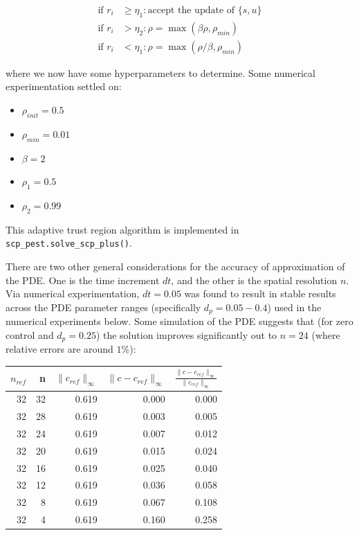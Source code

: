 \documentclass[11pt]{article}
\begin{document}
\begin{align}
\text{if } r_i &\geq \eta_1 : \text{accept the update of } \{s,u\} \nonumber \\
\text{if } r_i &> \eta_2 : \rho = \max\left(\beta \rho, \rho_{min}\right) \nonumber \\
\text{if } r_i &< \eta_1 : \rho = \max\left(\rho / \beta, \rho_{min}\right) \nonumber
\end{align}

where we now have some hyperparameters to determine. Some numerical experimentation settled on:

\begin{itemize}
\setlength\itemsep{-1pt}
\item $\rho_{init} = 0.5$
\item $\rho_{min} = 0.01$
\item $\beta = 2$
\item $\rho_1 = 0.5$
\item $\rho_2 = 0.99$
\end{itemize}

This adaptive trust region algorithm is implemented in \texttt{scp\_pest.solve\_scp\_plus()}.

There are two other general considerations for the accuracy of approximation of the PDE. One is the time increment $dt$, and the other is the spatial resolution $n$. Via numerical experimentation, $dt = 0.05$ was found to result in stable results across the PDE parameter ranges (specifically $d_p = 0.05 - 0.4$) used in the numerical experiments below. Some simulation of the PDE suggests that (for zero control and $d_p = 0.25$) the solution improves significantly out to $n = 24$ (where relative errors are around $1\%$):

\begin{center}
\begin{tabular}{rrrrr}
\toprule
$n_{ref}$ & n & $\| c_{ref} \|_{\infty}$ & $\| c-c_{ref} \|_{\infty}$ & $\frac{\| c-c_{ref} \|_{\infty}}{\| c_{ref} \|_{\infty}}$ \\
\midrule
32 & 32 & 0.619 & 0.000 & 0.000 \\
32 & 28 & 0.619 & 0.003 & 0.005 \\
32 & 24 & 0.619 & 0.007 & 0.012 \\
32 & 20 & 0.619 & 0.015 & 0.024 \\
32 & 16 & 0.619 & 0.025 & 0.040 \\
32 & 12 & 0.619 & 0.036 & 0.058 \\
32 & 8 & 0.619 & 0.067 & 0.108 \\
32 & 4 & 0.619 & 0.160 & 0.258 \\
\bottomrule
\end{tabular}
\end{center}
\end{document}
